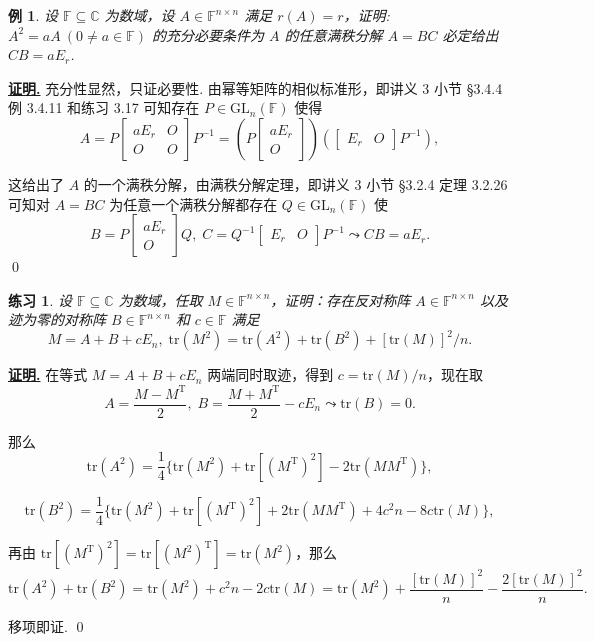 \documentclass[10pt,openany]{article}
\theoremstyle{thmstyle} %
\newtheorem{practice}{练习}[section]
\theoremstyle{defstyle} %
\theoremstyle{prostyle} %
\theoremstyle{exastyle}
\newtheorem{example}[theorem]{例}
\theoremstyle{remstyle}
\renewenvironment{proof}[1][证明]{\par\underline{\textbf{#1.}} \;\fangsong}{\qed\par}
\newcommand{\T}{^{\text{T}}}
\newcommand{\F}{\mathbb{F}}
\newcommand{\gfn}{\text{GL}_n(\mathbb{F})}
\newcommand{\C}{\mathbb{C}}
\newcommand{\n}{^{n \times n}}
\newcommand{\tr}{\mathrm{tr}}
\begin{document}
\begin{example}
	设 \( \F \subseteq \C \) 为数域，设 \( A \in \F\n \) 满足 \( r(A)=r \)，证明: \( A^2=aA \ (0 \neq a \in \F) \) 的充分必要条件为 \( A \) 的任意满秩分解 \( A=BC \) 必定给出 \( CB=aE_r \).
\end{example}

\begin{proof}
   充分性显然，只证必要性. 由幂等矩阵的相似标准形，即讲义 3 小节 \S 3.4.4  例 3.4.11 和练习 3.17 可知存在 \( P \in \gfn \) 使得
   \[ A=P\begin{bmatrix}
   	aE_r & O \\
   	O & O
   \end{bmatrix}P^{-1}= \left( P \begin{bmatrix}
   aE_r \\ O
   \end{bmatrix}\right) \left( \begin{bmatrix}
   E_r & O
   \end{bmatrix}P^{-1} \right), \]
   
   这给出了 \( A \) 的一个满秩分解，由满秩分解定理，即讲义 3 小节 \S 3.2.4 定理 3.2.26 可知对 \( A=BC \) 为任意一个满秩分解都存在 \( Q \in \gfn \) 使
   \[ B=P \begin{bmatrix}
   	aE_r \\ O
   \end{bmatrix} Q, \; C=Q^{-1} \begin{bmatrix}
   E_r & O
   \end{bmatrix}P^{-1} \leadsto CB=aE_r. \]
\end{proof}

\begin{practice}
	设 \( \F \subseteq \C \) 为数域，任取 \( M \in \F\n \)，证明：存在反对称阵 \( A \in \F\n \) 以及迹为零的对称阵 \( B \in \F\n \) 和 \( c \in \F \) 满足
	\[ M=A+B+cE_n, \; \tr(M^2)=\tr(A^2)+\tr(B^2)+[\tr(M)]^2/n. \]
\end{practice}

\begin{proof}
	在等式 \( M=A+B+cE_n \) 两端同时取迹，得到 \( c=\tr(M)/n \)，现在取
	\[ A=\frac{M-M\T}{2}, \; B=\frac{M+M\T}{2}-cE_n \leadsto \tr(B)=0. \]
	
	那么 
	\[ \tr(A^2)= \frac{1}{4} \{ \tr(M^2)+\tr[(M\T)^2]-2\tr(MM\T) \}, \]
	
	\[ \tr(B^2)= \frac{1}{4} \{ \tr(M^2)+\tr[(M\T)^2]+2\tr(MM\T)+4c^2n-8c\tr(M) \}, \]
	
	再由 \( \tr[(M\T)^2]=\tr[(M^2)\T]=\tr(M^2) \)，那么
	\[ \tr(A^2)+\tr(B^2)= \tr(M^2)+c^2n-2c\tr(M)= \tr(M^2)+ \frac{[\tr(M)]^2}{n}-\frac{2[\tr(M)]^2}{n}. \]
	
	移项即证.
\end{proof}
\end{document}
